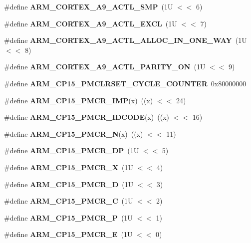 \begin{DoxyCompactItemize}
\item 
\#define {\bfseries A\+R\+M\+\_\+\+C\+O\+R\+T\+E\+X\+\_\+\+A9\+\_\+\+A\+C\+T\+L\+\_\+\+S\+MP}~(1\+U $<$$<$ 6)
\item 
\#define {\bfseries A\+R\+M\+\_\+\+C\+O\+R\+T\+E\+X\+\_\+\+A9\+\_\+\+A\+C\+T\+L\+\_\+\+E\+X\+CL}~(1\+U $<$$<$ 7)
\item 
\#define {\bfseries A\+R\+M\+\_\+\+C\+O\+R\+T\+E\+X\+\_\+\+A9\+\_\+\+A\+C\+T\+L\+\_\+\+A\+L\+L\+O\+C\+\_\+\+I\+N\+\_\+\+O\+N\+E\+\_\+\+W\+AY}~(1\+U $<$$<$ 8)
\item 
\#define {\bfseries A\+R\+M\+\_\+\+C\+O\+R\+T\+E\+X\+\_\+\+A9\+\_\+\+A\+C\+T\+L\+\_\+\+P\+A\+R\+I\+T\+Y\+\_\+\+ON}~(1\+U $<$$<$ 9)
\item 
\#define {\bfseries A\+R\+M\+\_\+\+C\+P15\+\_\+\+P\+M\+C\+L\+R\+S\+E\+T\+\_\+\+C\+Y\+C\+L\+E\+\_\+\+C\+O\+U\+N\+T\+ER}~0x80000000
\item 
\#define {\bfseries A\+R\+M\+\_\+\+C\+P15\+\_\+\+P\+M\+C\+R\+\_\+\+I\+MP}(x)~((x) $<$$<$ 24)
\item 
\#define {\bfseries A\+R\+M\+\_\+\+C\+P15\+\_\+\+P\+M\+C\+R\+\_\+\+I\+D\+C\+O\+DE}(x)~((x) $<$$<$ 16)
\item 
\#define {\bfseries A\+R\+M\+\_\+\+C\+P15\+\_\+\+P\+M\+C\+R\+\_\+N}(x)~((x) $<$$<$ 11)
\item 
\#define {\bfseries A\+R\+M\+\_\+\+C\+P15\+\_\+\+P\+M\+C\+R\+\_\+\+DP}~(1\+U $<$$<$ 5)
\item 
\#define {\bfseries A\+R\+M\+\_\+\+C\+P15\+\_\+\+P\+M\+C\+R\+\_\+X}~(1\+U $<$$<$ 4)
\item 
\#define {\bfseries A\+R\+M\+\_\+\+C\+P15\+\_\+\+P\+M\+C\+R\+\_\+D}~(1\+U $<$$<$ 3)
\item 
\#define {\bfseries A\+R\+M\+\_\+\+C\+P15\+\_\+\+P\+M\+C\+R\+\_\+C}~(1\+U $<$$<$ 2)
\item 
\#define {\bfseries A\+R\+M\+\_\+\+C\+P15\+\_\+\+P\+M\+C\+R\+\_\+P}~(1\+U $<$$<$ 1)
\item 
\#define {\bfseries A\+R\+M\+\_\+\+C\+P15\+\_\+\+P\+M\+C\+R\+\_\+E}~(1\+U $<$$<$ 0)
\end{DoxyCompactItemize}
